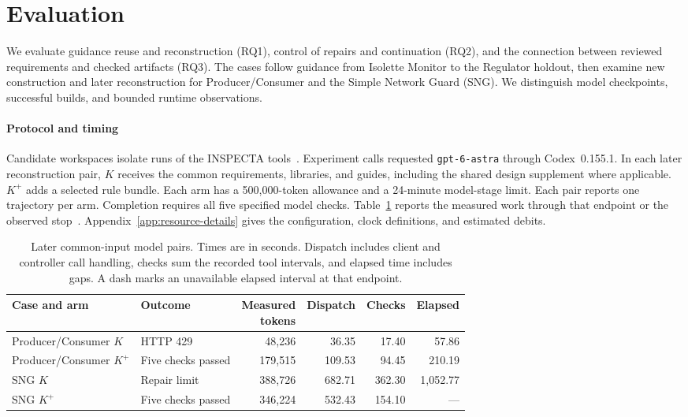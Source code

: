 \section{Evaluation}
\label{sec:evaluation}
\suppressfloats[t]

We evaluate guidance reuse and reconstruction (RQ1), control of repairs and continuation (RQ2), and the connection between reviewed requirements and checked artifacts (RQ3). The cases follow guidance from Isolette Monitor to the Regulator holdout, then examine new construction and later reconstruction for Producer/Consumer and the Simple Network Guard (SNG). We distinguish model checkpoints, successful builds, and bounded runtime observations.

\paragraph{Protocol and timing}
Candidate workspaces isolate runs of the INSPECTA tools~\cite{hardin2025dasc}. Experiment calls requested \texttt{gpt-6-astra} through Codex~0.155.1. In each later reconstruction pair, $K$ receives the common requirements, libraries, and guides, including the shared design supplement where applicable. $K^{+}$ adds a selected rule bundle. Each arm has a 500,000-token allowance and a 24-minute model-stage limit. Each pair reports one trajectory per arm. Completion requires all five specified model checks. Table~\ref{tab:sng-comparison} reports the measured work through that endpoint or the observed stop~\cite{sigplanEmpirical2018}. Appendix~\ref{app:resource-details} gives the configuration, clock definitions, and estimated debits.

\begin{table}[!htbp]
\caption{Later common-input model pairs. Times are in seconds. Dispatch includes client and controller call handling, checks sum the recorded tool intervals, and elapsed time includes gaps. A dash marks an unavailable elapsed interval at that endpoint.}
\label{tab:sng-comparison}
\centering\small
\setlength{\tabcolsep}{4pt}
\begin{tabular}{@{}>{\raggedright\arraybackslash}p{.24\linewidth}>{\raggedright\arraybackslash}p{.24\linewidth}rrrr@{}}
\toprule
Case and arm & Outcome & \shortstack[r]{Measured\\tokens} & Dispatch & Checks & Elapsed \\
\midrule
Producer/Consumer $K$ & HTTP 429 & 48,236 & 36.35 & 17.40 & 57.86 \\
Producer/Consumer $K^{+}$ & Five checks passed & 179,515 & 109.53 & 94.45 & 210.19 \\
SNG $K$ & Repair limit & 388,726 & 682.71 & 362.30 & 1,052.77 \\
SNG $K^{+}$ & Five checks passed & 346,224 & 532.43 & 154.10 & --- \\
\bottomrule
\end{tabular}
\end{table}

